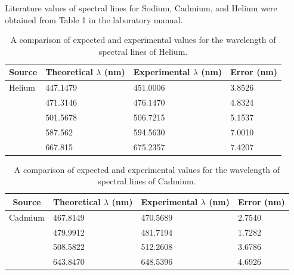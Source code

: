 \documentclass[justified]{tufte-book}
\begin{document}
\begin{enumerate}
Literature values of spectral lines for Sodium, Cadmium, and Helium were obtained from Table 1 in the laboratory manual.


\begin{table}[ht]
\center
\begin{tabular}{|l|l|l|l|}
\hline
\multicolumn{1}{|c|}{Source} & \multicolumn{1}{c|}{Theoretical $\lambda$ (nm)} & \multicolumn{1}{c|}{Experimental $\lambda$ (nm)} & \multicolumn{1}{c|}{Error (nm)} \\ \hline
Helium                       & 447.1479                                        & 451.0006                                   & 3.8526                          \\ \hline
                             & 471.3146                                        & 476.1470                                         & 4.8324                          \\ \hline
                             & 501.5678                                        & 506.7215                                         & 5.1537                          \\ \hline
                             & 587.562                                         & 594.5630                                         & 7.0010                          \\ \hline
                             & 667.815                                         & 675.2357                                         & 7.4207                          \\ \hline
\end{tabular}
\caption{A comparison of expected and experimental values for the wavelength of spectral lines of Helium.}
\label{tab:spcg6}
\end{table}


\begin{table}[ht]
\center
\begin{tabular}{|l|l|l|l|}
\hline
\multicolumn{1}{|c|}{Source} & \multicolumn{1}{c|}{Theoretical $\lambda$ (nm)} & \multicolumn{1}{c|}{Experimental $\lambda$ (nm)} & \multicolumn{1}{c|}{Error (nm)} \\ \hline
Cadmium                       & 467.8149                                        & 470.5689                                         & 2.7540                          \\ \hline
                             & 479.9912                                        & 481.7194                                         & 1.7282                          \\ \hline
                             & 508.5822                                        & 512.2608                                         & 3.6786                          \\ \hline
                             & 643.8470                                        & 648.5396                                         & 4.6926                          \\ \hline
\end{tabular}
\caption{A comparison of expected and experimental values for the wavelength of spectral lines of Cadmium.}
\label{tab:spcg7}
\end{table}


\end{enumerate}
\end{document}
